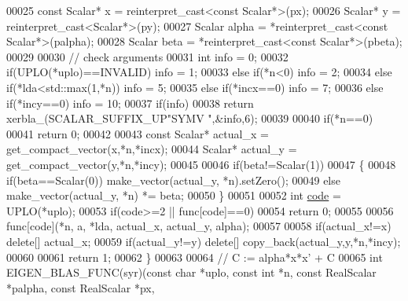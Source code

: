 \begin{DoxyCode}
00025   \textcolor{keyword}{const} Scalar* x = \textcolor{keyword}{reinterpret\_cast<}\textcolor{keyword}{const }Scalar*\textcolor{keyword}{>}(px);
00026   Scalar* y = \textcolor{keyword}{reinterpret\_cast<}Scalar*\textcolor{keyword}{>}(py);
00027   Scalar alpha  = *\textcolor{keyword}{reinterpret\_cast<}\textcolor{keyword}{const }Scalar*\textcolor{keyword}{>}(palpha);
00028   Scalar beta   = *\textcolor{keyword}{reinterpret\_cast<}\textcolor{keyword}{const }Scalar*\textcolor{keyword}{>}(pbeta);
00029 
00030   \textcolor{comment}{// check arguments}
00031   \textcolor{keywordtype}{int} info = 0;
00032   \textcolor{keywordflow}{if}(UPLO(*uplo)==INVALID)        info = 1;
00033   \textcolor{keywordflow}{else} \textcolor{keywordflow}{if}(*n<0)                   info = 2;
00034   \textcolor{keywordflow}{else} \textcolor{keywordflow}{if}(*lda<std::max(1,*n))    info = 5;
00035   \textcolor{keywordflow}{else} \textcolor{keywordflow}{if}(*incx==0)               info = 7;
00036   \textcolor{keywordflow}{else} \textcolor{keywordflow}{if}(*incy==0)               info = 10;
00037   \textcolor{keywordflow}{if}(info)
00038     \textcolor{keywordflow}{return} xerbla\_(SCALAR\_SUFFIX\_UP\textcolor{stringliteral}{"SYMV "},&info,6);
00039 
00040   \textcolor{keywordflow}{if}(*n==0)
00041     \textcolor{keywordflow}{return} 0;
00042 
00043   \textcolor{keyword}{const} Scalar* actual\_x = get\_compact\_vector(x,*n,*incx);
00044   Scalar* actual\_y = get\_compact\_vector(y,*n,*incy);
00045 
00046   \textcolor{keywordflow}{if}(beta!=Scalar(1))
00047   \{
00048     \textcolor{keywordflow}{if}(beta==Scalar(0)) make\_vector(actual\_y, *n).setZero();
00049     \textcolor{keywordflow}{else}                make\_vector(actual\_y, *n) *= beta;
00050   \}
00051 
00052   \textcolor{keywordtype}{int} \hyperlink{structcode}{code} = UPLO(*uplo);
00053   \textcolor{keywordflow}{if}(code>=2 || func[code]==0)
00054     \textcolor{keywordflow}{return} 0;
00055 
00056   func[code](*n, a, *lda, actual\_x, actual\_y, alpha);
00057 
00058   \textcolor{keywordflow}{if}(actual\_x!=x) \textcolor{keyword}{delete}[] actual\_x;
00059   \textcolor{keywordflow}{if}(actual\_y!=y) \textcolor{keyword}{delete}[] copy\_back(actual\_y,y,*n,*incy);
00060 
00061   \textcolor{keywordflow}{return} 1;
00062 \}
00063 
00064 \textcolor{comment}{// C := alpha*x*x' + C}
00065 \textcolor{keywordtype}{int} EIGEN\_BLAS\_FUNC(syr)(\textcolor{keyword}{const} \textcolor{keywordtype}{char} *uplo, \textcolor{keyword}{const} \textcolor{keywordtype}{int} *n, \textcolor{keyword}{const} RealScalar *palpha, \textcolor{keyword}{const} RealScalar *px, \textcolor{keyword}{
}
\end{DoxyCode}
